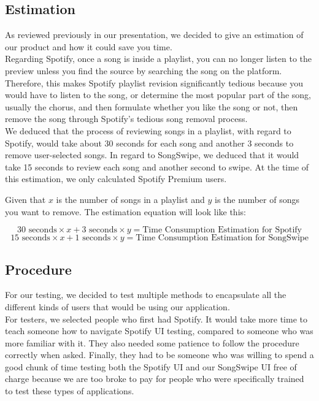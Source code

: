 \documentclass{article}
\begin{document}
\subsection{Estimation}
\quad As reviewed previously in our presentation, we decided to give an estimation of our product and how it could save you time. \\

Regarding Spotify, once a song is inside a playlist, you can no longer listen to the preview unless you find the source by searching the song on the platform. Therefore, this makes Spotify playlist revision significantly tedious because you would have to listen to the song, or determine the most popular part of the song, usually the chorus, and then formulate whether you like the song or not, then remove the song through Spotify’s tedious song removal process. \\

We deduced that the process of reviewing songs in a playlist, with regard to Spotify, would take about 30 seconds for each song and another 3 seconds to remove user-selected songs. In regard to SongSwipe, we deduced that it would take 15 seconds to review each song and another second to swipe. At the time of this estimation, we only calculated Spotify Premium users.

\begin{center}
Given that $x$ is the number of songs in a playlist and $y$ is the number of songs you want to remove. The estimation equation will look like this:
\end{center}
\begin{equation}
30 \text{ seconds} \times x + 3 \text{ seconds} \times y = \text{Time Consumption Estimation for Spotify}
\end{equation}
\begin{equation}
15 \text{ seconds} \times x + 1 \text{ seconds} \times y = \text{Time Consumption Estimation for SongSwipe}
\end{equation}
\subsection{Procedure}
    For our testing, we decided to test multiple methods to encapsulate all the different kinds of users that would be using our application. \\

    For testers, we selected people who first had Spotify. It would take more time to teach someone how to navigate Spotify UI testing, compared to someone who was more familiar with it. They also needed some patience to follow the procedure correctly when asked. Finally, they had to be someone who was willing to spend a good chunk of time testing both the Spotify UI and our SongSwipe UI free of charge because we are too broke to pay for people who were specifically trained to test these types of applications.
\end{document}
